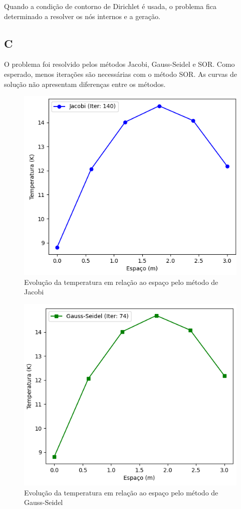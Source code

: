 \documentclass[]{article}
\begin{document}
Quando a condição de contorno de Dirichlet é usada, o problema fica determinado a resolver os nós internos e a geração.

\subsection*{C}
O problema foi resolvido pelos métodos Jacobi, Gauss-Seidel e SOR. Como esperado, menos iterações são necessárias com o método SOR. As curvas de solução não apresentam diferenças entre os métodos.

\begin{figure}[H]
	\centering
	\includegraphics[width=.65\textwidth]{figures/316-1}
	\caption{Evolução da temperatura em relação ao espaço pelo método de Jacobi}
\end{figure}

\begin{figure}[H]
	\centering
	\includegraphics[width=.65\textwidth]{figures/316-2}
	\caption{Evolução da temperatura em relação ao espaço pelo método de Gauss-Seidel}
\end{figure}
\end{document}
